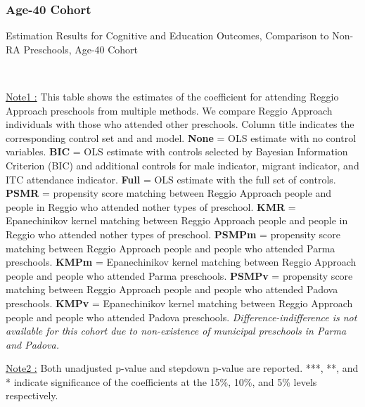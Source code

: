 \subsubsection{Age-40 Cohort}
\begin{table}[H] \caption{Estimation Results for Cognitive and Education Outcomes, Comparison to Non-RA Preschools, Age-40 Cohort} \label{ols-CN-adult40-reg-other}
\scalebox{0.6}{}
\vspace{1ex} \\
\footnotesize\raggedright{\underline{Note1 :} This table shows the estimates of the coefficient for attending Reggio Approach preschools from multiple methods. We compare Reggio Approach individuals with those who attended other preschools. Column title indicates the corresponding control set and and model. \textbf{None} = OLS estimate with no control variables. \textbf{BIC} = OLS estimate with controls selected by Bayesian Information Criterion (BIC) and additional controls for male indicator, migrant indicator, and ITC attendance indicator. \textbf{Full} = OLS estimate with the full set of controls. \textbf{PSMR} =  propensity score matching between Reggio Approach people and people in Reggio who attended nother types of preschool. \textbf{KMR} = Epanechinikov kernel matching between Reggio Approach people and people in Reggio who attended nother types of preschool. \textbf{PSMPm} = propensity score matching between Reggio Approach people and people who attended Parma preschools. \textbf{KMPm} = Epanechinikov kernel matching between Reggio Approach people and people who attended Parma preschools. \textbf{PSMPv} = propensity score matching between Reggio Approach people and people who attended Padova preschools. \textbf{KMPv} = Epanechinikov kernel matching between Reggio Approach people and people who attended Padova preschools. \textit{Difference-indifference is not available for this cohort due to non-existence of municipal preschools in Parma and Padova.}} 

\footnotesize\raggedright{\underline{Note2 :} Both unadjusted p-value and stepdown p-value are reported. ***, **, and * indicate significance of the coefficients at the 15\%, 10\%, and 5\% levels respectively.}
\end{table}

